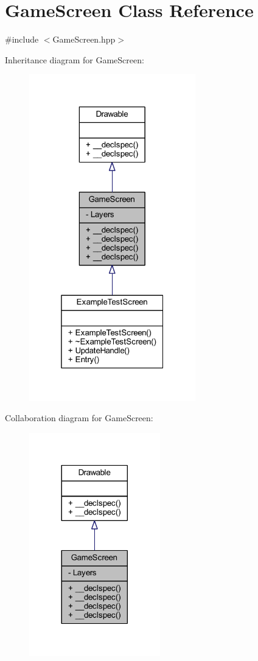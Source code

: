 \hypertarget{class_game_screen}{\section{Game\-Screen Class Reference}
\label{class_game_screen}
}


{\ttfamily \#include $<$Game\-Screen.\-hpp$>$}



Inheritance diagram for Game\-Screen\-:\nopagebreak
\begin{figure}[H]
\begin{center}
\leavevmode
\includegraphics[width=205pt]{class_game_screen__inherit__graph}
\end{center}
\end{figure}


Collaboration diagram for Game\-Screen\-:\nopagebreak
\begin{figure}[H]
\begin{center}
\leavevmode
\includegraphics[width=161pt]{class_game_screen__coll__graph}
\end{center}
\end{figure}
